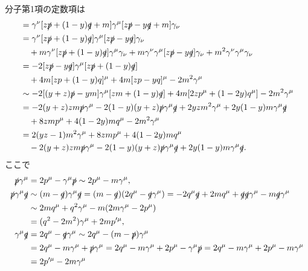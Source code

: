 分子第1項の定数項は
\begin{align*}
  &= \gamma^\nu [z\slashed{p}+(1-y)\slashed{q}+m] \gamma^\mu [z\slashed{p}-y\slashed{q}+m] \gamma_\nu \\
  &= \gamma^\nu [z\slashed{p}+(1-y)\slashed{q}] \gamma^\mu [z\slashed{p}-y\slashed{q}] \gamma_\nu \\
  &\quad + m \gamma^\nu [z\slashed{p}+(1-y)\slashed{q}] \gamma^\mu \gamma_\nu
  + m \gamma^\nu \gamma^\mu [z\slashed{p}-y\slashed{q}] \gamma_\nu
  + m^2\gamma^\nu \gamma^\mu \gamma_\nu \\
  &= -2 [z\slashed{p}-y\slashed{q}] \gamma^\mu [z\slashed{p}+(1-y)\slashed{q}] \\
  &\quad + 4m [zp+(1-y)q]^\mu + 4m [zp-yq]^\mu - 2m^2 \gamma^\mu \\
  &\sim -2 [(y+z)\slashed{p}-ym] \gamma^\mu [zm+(1-y)\slashed{q}] + 4m [2zp^\mu+(1-2y)q^\mu] - 2m^2 \gamma^\mu \\
  &= -2(y+z)zm\slashed{p}\gamma^\mu - 2(1-y)(y+z)\slashed{p}\gamma^\mu\slashed{q} + 2yzm^2\gamma^\mu + 2y(1-y)m \gamma^\mu\slashed{q} \\
  &\quad + 8zmp^\mu + 4(1-2y)mq^\mu - 2m^2 \gamma^\mu \\
  &= 2(yz-1) m^2\gamma^\mu + 8zmp^\mu + 4(1-2y)mq^\mu \\
  &\quad -2(y+z)zm\slashed{p}\gamma^\mu - 2(1-y)(y+z)\slashed{p}\gamma^\mu\slashed{q} + 2y(1-y)m \gamma^\mu\slashed{q} .
\end{align*}
ここで
\begin{align*}
  \slashed{p}\gamma^\mu &= 2p^\mu - \gamma^\mu\slashed{p} \sim 2p^\mu - m\gamma^\mu , \\
  \slashed{p}\gamma^\mu\slashed{q} &\sim (m-\slashed{q}) \gamma^\mu \slashed{q}
  = (m-\slashed{q}) (2q^\mu - \slashed{q} \gamma^\mu )
  = - 2q^\mu\slashed{q} + 2mq^\mu + \slashed{q}\slashed{q}\gamma^\mu - m \slashed{q}\gamma^\mu \\
  &\sim 2mq^\mu + q^2\gamma^\mu - m(2m\gamma^\mu - 2p^\mu) \\
  &= (q^2-2m^2) \gamma^\mu + 2mp'^\mu , \\
  \gamma^\mu\slashed{q} &= 2q^\mu - \slashed{q}\gamma^\mu \sim 2q^\mu - (m-\slashed{p})\gamma^\mu \\
  &= 2q^\mu - m\gamma^\mu + \slashed{p}\gamma^\mu
  = 2q^\mu - m\gamma^\mu + 2p^\mu - \gamma^\mu\slashed{p}
  = 2q^\mu - m\gamma^\mu + 2p^\mu - m\gamma^\mu \\
  &= 2p'^\mu - 2m\gamma^\mu
\end{align*}
